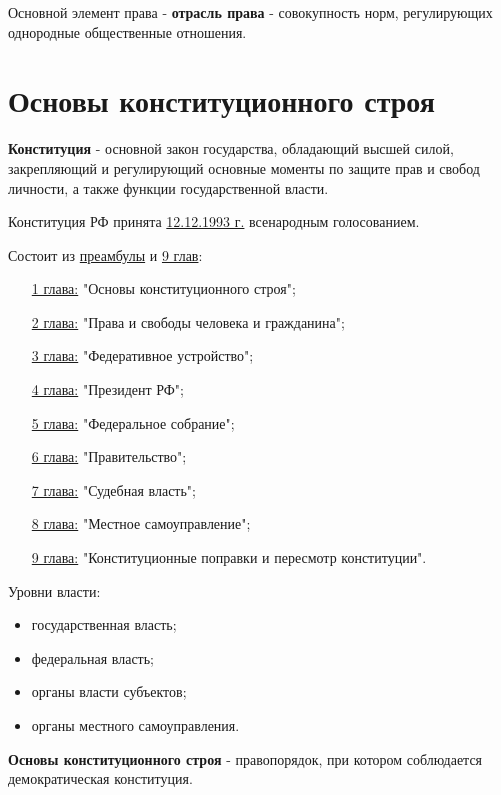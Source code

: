 \documentclass[a5paper,10pt]{article}
\begin{document}
			Основной элемент права - \textbf{отрасль права} - совокупность норм, регулирующих однородные общественные отношения.
	
	\section{Основы конституционного строя}
		\textbf{Конституция} - основной закон государства, обладающий высшей силой, закрепляющий и регулирующий основные моменты по защите прав и свобод личности, а также функции государственной власти.

		\begin{framed}
			Конституция РФ принята \underline{12.12.1993 г.} всенародным голосованием.
		\end{framed}

		Состоит из \underline{преамбулы} и \underline{9 глав}:
		\begin{itemize}[itemsep=0pt]
			\item[\underline{1 глава:}] "Основы конституционного строя";
			\item[\underline{2 глава:}] "Права и свободы человека и гражданина";
			\item[\underline{3 глава:}] "Федеративное устройство";
			\item[\underline{4 глава:}] "Президент РФ";
			\item[\underline{5 глава:}] "Федеральное собрание";
			\item[\underline{6 глава:}] "Правительство";
			\item[\underline{7 глава:}] "Судебная власть";
			\item[\underline{8 глава:}] "Местное самоуправление";
			\item[\underline{9 глава:}] "Конституционные поправки и пересмотр конституции".
		\end{itemize}

		\begin{framed}
			Уровни власти:
			\begin{itemize}[itemsep=0pt]
				\item государственная власть;
				\item федеральная власть;
				\item органы власти субъектов;
				\item органы местного самоуправления.
			\end{itemize}
		\end{framed}

		\textbf{Основы конституционного строя} - правопорядок, при котором соблюдается демократическая конституция.
\end{document}

